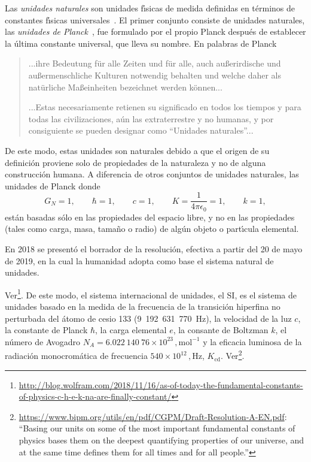 Las \emph{unidades naturales} son unidades f\'\i sicas de medida definidas en t\'erminos de constantes f\'\i sicas universales~\cite{NU}. El primer conjunto consiste de unidades naturales, las \emph{unidades de Planck}~\cite{PU},  fue formulado por el propio Planck despu\'es de establecer la \'ultima constante universal, que lleva su nombre.  En palabras de Planck
\begin{quotation} %

  ...ihre Bedeutung f\"ur alle Zeiten und f\"ur alle, auch au\ss erirdische und au\ss ermenschliche Kulturen notwendig behalten und welche daher als \guillemotright nat\"urliche Ma\ss einheiten bezeichnet werden k\"onnen... %

...Estas necesariamente retienen su significado en todos los tiempos y para todas las civilizaciones, aún las extraterrestre y no humanas, y por consiguiente se pueden designar como ``Unidades naturales''...
\end{quotation} %
De este modo, estas unidades son naturales debido a que el origen de su definici\'on proviene solo de propiedades de la naturaleza y no de alguna construcci\'on humana. A diferencia de otros conjuntos de unidades naturales, las unidades de Planck donde
\begin{equation}
\label{eq:144}
  G_N=1,\qquad \hbar=1,\qquad c=1,\qquad K=\frac{1}{4\pi\epsilon_0}=1,\qquad k=1,
\end{equation}
est\'an basadas s\'olo en las propiedades del espacio libre, y no en las propiedades (tales como carga, masa, tama\~no o radio) de alg\'un objeto o part\'\i cula elemental. 
\begin{frame}
En 2018 se presentó el borrador de la resolución, efectiva a partir del 20 de mayo  de 2019, en la cual la humanidad adopta como base el sistema natural de unidades.
\end{frame}
Ver\footnote{\url{http://blog.wolfram.com/2018/11/16/as-of-today-the-fundamental-constants-of-physics-c-h-e-k-na-are-finally-constant/}}. De este modo, el sistema internacional  de unidades, el SI, es el sistema de unidades basado en la medida de la frecuencia de la transición hiperfina no perturbada del átomo de cesio 133 (9~192~631~770~Hz), la velocidad de la luz $c$, la constante de Planck $\hbar$, la carga elemental $e$, la consante de Boltzman $k$, el número de Avogadro $N_A=6.022~140~76\times 10^{23}\,,\text{mol}^{-1}$ y la eficacia luminosa de la radiación monocromática de frecuencia $540\times 10^{12}\,,\text{Hz}$, $K_{\text{cd}}$. Ver\footnote{\url{https://www.bipm.org/utils/en/pdf/CGPM/Draft-Resolution-A-EN.pdf}: ``Basing our units on some of the most important fundamental constants of physics bases them on the deepest quantifying properties of our universe, and at the same time defines them for all times and for all people.''}.

